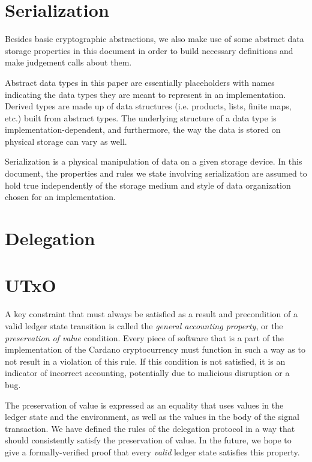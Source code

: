 \documentclass[11pt,a4paper,dvipsnames]{article}
\theoremstyle{definition}
\theoremstyle{definition}
\begin{document}
\clearpage

\section{Serialization}
\label{sec:serialization}


Besides basic cryptographic abstractions, we also make use of some abstract
data storage properties in this document in order to build necessary definitions
and make judgement calls about them.

Abstract data types in this paper are essentially placeholders with names
indicating the data types they are meant to represent in an implementation.
Derived types are made up of data structures (i.e. products, lists, finite
maps, etc.) built from abstract types. The underlying structure of a data type
is implementation-dependent, and furthermore, the way the data is stored on
physical storage can vary as well.

Serialization is a physical manipulation of data on a given storage device.
In this document, the properties and rules we state involving serialization are
assumed to hold true independently of the storage medium and style of data
organization chosen for an implementation.

\section{Delegation}
\label{sec:delegation}


\clearpage

\section{UTxO}
\label{sec:utxo}

A key constraint that must always be satisfied as a result and precondition of
a valid ledger state transition is called the \textit{general accounting
property}, or the \textit{preservation of value} condition. Every piece of
software that is a part of the implementation of the
Cardano cryptocurrency must function in such a way as to not result in
a violation of this rule.
If this condition is not satisfied, it is an indicator of
incorrect accounting, potentially due to
malicious disruption or a bug.

The preservation of value is expressed as an equality that uses values in
the ledger state and the environment, as well as the values in the body of
the signal transaction.
We have defined the rules of the delegation protocol in a way that should
consistently satisfy the preservation of value. In the future, we hope to
give a formally-verified proof that every \textit{valid} ledger state satisfies
this property.
\end{document}
